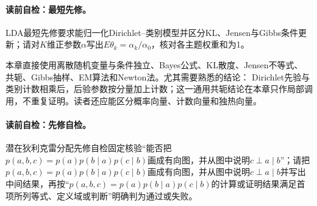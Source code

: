
\label{struct:V5-C06-CH02}
\paragraph{读前自检：最短先修。}LDA最短先修要求能归一化Dirichlet--类别模型并区分KL、Jensen与Gibbs条件更新；请对$K$维正参数$\alpha$写出$E\theta_k=\alpha_k/\alpha_0$，核对各主题权重和为1。\par

\begin{prerequisitebox}
本章直接使用离散随机变量与条件独立、Bayes公式、KL散度、Jensen不等式、
\DirichletMultinomial{}共轭、Gibbs抽样、EM算法和Newton法。尤其需要熟悉的结论：
Dirichlet先验与类别计数相乘后，后验参数按分量加上计数；这一通用共轭结论在本章只作局部调用，不重复证明。读者还应能区分概率向量、计数向量和独热向量。
\end{prerequisitebox}

\label{struct:V5-C06-CH03}
\paragraph{读前自检：先修自检。}潜在狄利克雷分配先修自检固定核验“能否把$p(a,b,c)=p(a)p(b\mid a)p(c\mid b)$画成有向图，并从图中说明$c\perp a\mid b$”；请把$p(a,b,c)=p(a)p(b\mid a)p(c\mid b)$画成有向图，并从图中说明$c\perp a\mid b$并写出中间结果，再按“$p(a,b,c)=p(a)p(b\mid a)p(c\mid b)$的计算或证明结果满足首项所列等式、定义域或判断”明确判为通过或失败。\par

